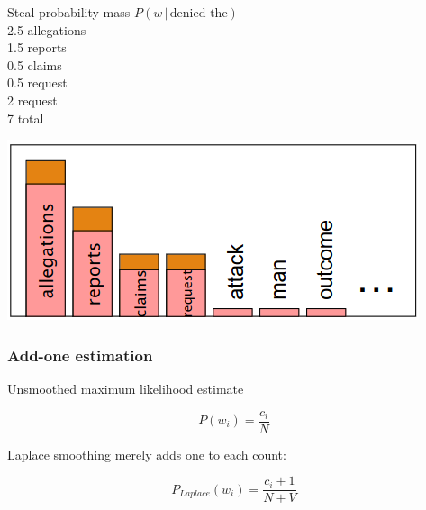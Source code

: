 \documentclass[13.5pt,aspecratio=169]{beamer}
\begin{document}
\begin{frame}
    \begin{minipage}{0.45\textwidth}  %
        \begin{block}{Steal probability mass} %
            \hspace{30pt} $P(w \hspace{2pt} | \hspace{2pt} \text{denied the})$ \\
            \hspace{35pt} 2.5 allegations \\
            \hspace{35pt} 1.5 reports \\
            \hspace{35pt} 0.5 claims \\
            \hspace{35pt} 0.5 request \\
            \hspace{35pt} 2 request \\
            \hspace{35pt} 7 total
        \end{block}
    \end{minipage}\hspace{10pt}
    \begin{minipage}{0.45\textwidth}  %
            \centering
            \includegraphics[scale=0.5]{steal_probability_mass.png}
    \end{minipage}
	

\end{frame}





\begin{frame}
    \onehalfspacing
        \frametitle{Add-one estimation}
        
        {\Large Unsmoothed maximum likelihood estimate} \vspace{-2em}
        {\Large
        \begin{center} 
            \[ P(w_i) = \frac{c_i}{N} \]
        \end{center}
        }
        {\Large Laplace smoothing merely adds one to each count:} \vspace{-2em}
        {\Large
        \begin{center} 
            \[ P_{Laplace} (w_i) = \frac{c_i + 1}{N + V} \]
        \end{center}
        }
\end{frame}
    
\end{document}
